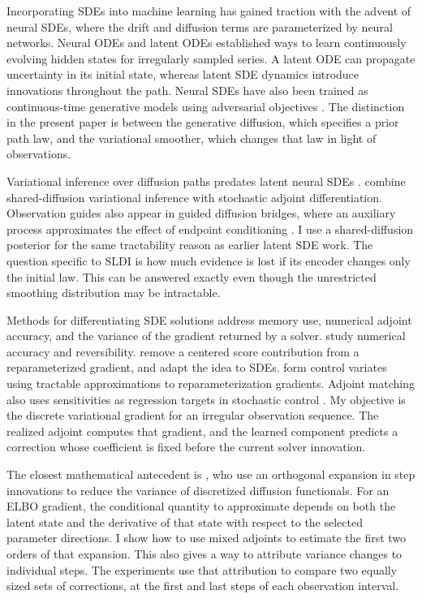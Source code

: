 \documentclass[12pt]{article}
\begin{document}
Incorporating SDEs into machine learning has gained traction with the advent of neural SDEs, where the drift and diffusion terms are parameterized by neural networks. Neural ODEs \citep{Chen2018} and latent ODEs \citep{rubanova2019latent} established ways to learn continuously evolving hidden states for irregularly sampled series. A latent ODE can propagate uncertainty in its initial state, whereas latent SDE dynamics introduce innovations throughout the path. Neural SDEs have also been trained as continuous-time generative models using adversarial objectives \citep{kidger2021neural}. The distinction in the present paper is between the generative diffusion, which specifies a prior path law, and the variational smoother, which changes that law in light of observations.

Variational inference over diffusion paths predates latent neural SDEs \citep{archambeau2007variational}. \citet{li2020scalable} combine shared-diffusion variational inference with stochastic adjoint differentiation. Observation guides also appear in guided diffusion bridges, where an auxiliary process approximates the effect of endpoint conditioning \citep{schauer2017guided}. I use a shared-diffusion posterior for the same tractability reason as earlier latent SDE work. The question specific to SLDI is how much evidence is lost if its encoder changes only the initial law. This can be answered exactly even though the unrestricted smoothing distribution may be intractable.

Methods for differentiating SDE solutions address memory use, numerical adjoint accuracy, and the variance of the gradient returned by a solver. \citet{kidger2021efficient} study numerical accuracy and reversibility. \citet{roeder2017sticking} remove a centered score contribution from a reparameterized gradient, and \citet{xu2022infinitely} adapt the idea to SDEs. \citet{miller2017reducing} form control variates using tractable approximations to reparameterization gradients. Adjoint matching also uses sensitivities as regression targets in stochastic control \citep{dom2025adjoint,mei2026bsde}. My objective is the discrete variational gradient for an irregular observation sequence. The realized adjoint computes that gradient, and the learned component predicts a correction whose coefficient is fixed before the current solver innovation.

The closest mathematical antecedent is \citet{belomestny2018variance}, who use an orthogonal expansion in step innovations to reduce the variance of discretized diffusion functionals. For an ELBO gradient, the conditional quantity to approximate depends on both the latent state and the derivative of that state with respect to the selected parameter directions. I show how to use mixed adjoints to estimate the first two orders of that expansion. This also gives a way to attribute variance changes to individual steps. The experiments use that attribution to compare two equally sized sets of corrections, at the first and last steps of each observation interval.
\end{document}
